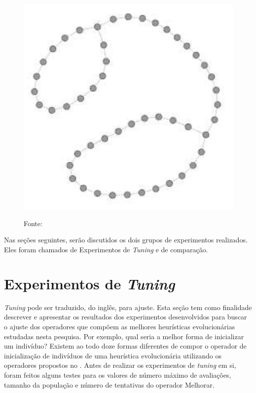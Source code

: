 \begin{figure}[tp]
\begin{minipage}{0.5\textwidth}
		\label{fig:islands}
	\end{minipage}
	\begin{minipage}{0.5\textwidth}
		\centering
		\includegraphics[width=\linewidth]{images/mapa_cicles_corridor.png}
		\label{fig:cicles_corridor}
	\end{minipage}
	\caption*{Fonte: \citep{sampaiophd}}
	\label{fig:mapas}
\end{figure}

Nas seções seguintes, serão discutidos os dois grupos de experimentos 
realizados. Eles foram chamados de Experimentos de \textit{Tuning} e de 
comparação.

\section{Experimentos de \textit{Tuning}}

\textit{Tuning} pode ser traduzido, do inglês, para ajuste. Esta seção tem como 
finalidade descrever e apresentar os resultados dos experimentos desenvolvidos 
para buscar o ajuste dos operadores que compõem as melhores heurísticas 
evolucionárias estudadas nesta pesquisa. Por exemplo, qual seria a melhor forma 
de inicializar um indivíduo? Existem ao todo doze formas diferentes de compor 
o operador de inicialização de indivíduos de uma heurística evolucionária 
utilizando os operadores propostos no . Antes de 
realizar os experimentos de \textit{tuning} em si, foram feitos alguns testes 
para os valores de número máximo de avaliações, tamanho da população e número de 
tentativas do operador Melhorar.

